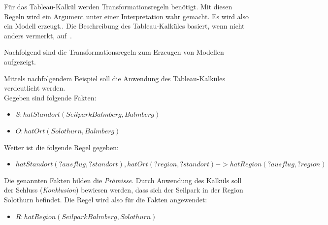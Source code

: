 Für das Tableau-Kalkül werden Transformationsregeln benötigt. Mit diesen Regeln wird ein Argument unter einer Interpretation wahr gemacht. Es wird also ein Modell erzeugt.\cite{baumkalkuel}. Die Beschreibung des Tableau-Kalküles basiert, wenn nicht anders vermerkt, auf~\cite{baumkalkuel}.

Nachfolgend sind die Transformationsregeln zum Erzeugen von Modellen aufgezeigt.

\begin{table}[H]
\centering
{} \hfill
{}
\label{fig:tableau:regeln}
\end{table}

Mittels nachfolgendem Beispiel soll die Anwendung des Tableau-Kalküles verdeutlicht werden.\\
Gegeben sind folgende Fakten:
\begin{itemize}
    \item $S: hatStandort(SeilparkBalmberg, Balmberg)$
    \item $O: hatOrt(Solothurn, Balmberg)$
\end{itemize}
Weiter ist die folgende Regel gegeben:
\begin{itemize}
    \item $hatStandort(?ausflug, ?standort), hatOrt(?region, ?standort) -> hatRegion(?ausflug, ?region)$
\end{itemize}
Die genannten Fakten bilden die \textit{Prämisse}. Durch Anwendung des Kalküls soll der Schluss (\textit{Konklusion}) bewiesen werden, dass sich der Seilpark in der Region Solothurn befindet. Die Regel wird also für die Fakten angewendet:
\begin{itemize}
    \item $R: hatRegion(SeilparkBalmberg, Solothurn)$
\end{itemize}

